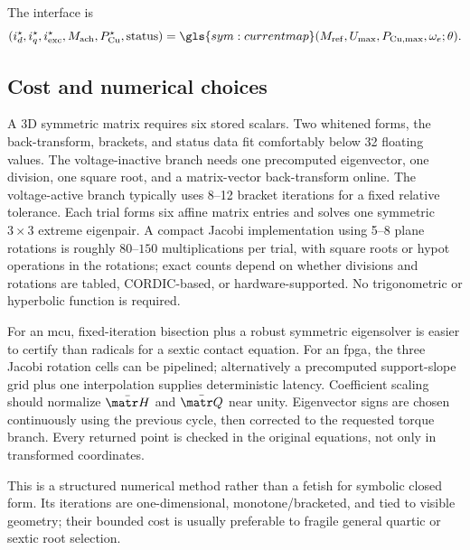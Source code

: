 The interface is
\begin{equation}
 (i_d^\star,i_q^\star,i_{\mathrm{exc}}^\star,M_{\mathrm{ach}},
 P_{\mathrm{Cu}}^\star,\mathrm{status})
 =\gls{sym:currentmap}(M_{\mathrm{ref}},U_{\max},P_{\mathrm{Cu},\max},
 \omega_e;\theta).
 \label{eq:controller-map}
\end{equation}

\subsection{Cost and numerical choices}

A 3D symmetric matrix requires six stored scalars. Two whitened forms, the
back-transform, brackets, and status data fit comfortably below 32 floating
values. The voltage-inactive branch needs one precomputed eigenvector, one
division, one square root, and a matrix-vector back-transform online. The
voltage-active branch typically uses 8--12 bracket iterations for a fixed
relative tolerance. Each trial forms six affine matrix entries and solves one
symmetric \(3\times3\) extreme eigenpair. A compact Jacobi implementation
using 5--8 plane rotations is roughly \(80\)--\(150\) multiplications per
trial, with square roots or hypot operations in the rotations; exact counts
depend on whether divisions and rotations are tabled, CORDIC-based, or
hardware-supported. No trigonometric or hyperbolic function is required.

For an \gls{mcu}, fixed-iteration bisection plus a robust symmetric eigensolver
is easier to certify than radicals for a sextic contact equation. For an
\gls{fpga}, the three Jacobi rotation cells can be pipelined; alternatively a
precomputed support-slope grid plus one interpolation supplies deterministic
latency. Coefficient scaling should normalize \(\bar{\matr H}\) and
\(\bar{\matr Q}\) near unity. Eigenvector signs are chosen continuously using
the previous cycle, then corrected to the requested torque branch. Every
returned point is checked in the original equations, not only in transformed
coordinates.

This is a structured numerical method rather than a fetish for symbolic
closed form. Its iterations are one-dimensional, monotone/bracketed, and tied
to visible geometry; their bounded cost is usually preferable to fragile
general quartic or sextic root selection.

